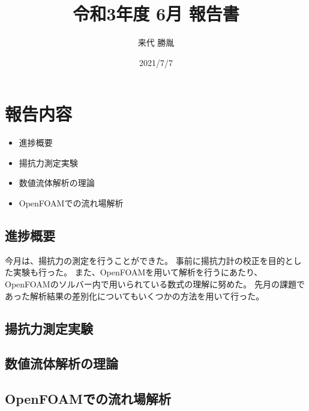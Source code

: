 \documentclass[twocolumn,a4j]{jsarticle}
\author{来代 勝胤}
\title{令和3年度 6月 報告書}
\date{2021/7/7}
\begin{document}
\columnseprule=0.1mm
\maketitle
\section{\large 報告内容}
\begin{itemize}
    \item 進捗概要
    \item 揚抗力測定実験
    \item 数値流体解析の理論
    \item OpenFOAMでの流れ場解析
\end{itemize}
\subsection{進捗概要}
今月は、揚抗力の測定を行うことができた。
事前に揚抗力計の校正を目的とした実験も行った。
また、OpenFOAMを用いて解析を行うにあたり、
OpenFOAMのソルバー内で用いられている数式の理解に努めた。
先月の課題であった解析結果の差別化についてもいくつかの方法を用いて行った。
\subsection{揚抗力測定実験}
\subsection{数値流体解析の理論}
\subsection{OpenFOAMでの流れ場解析}
\end{document}
